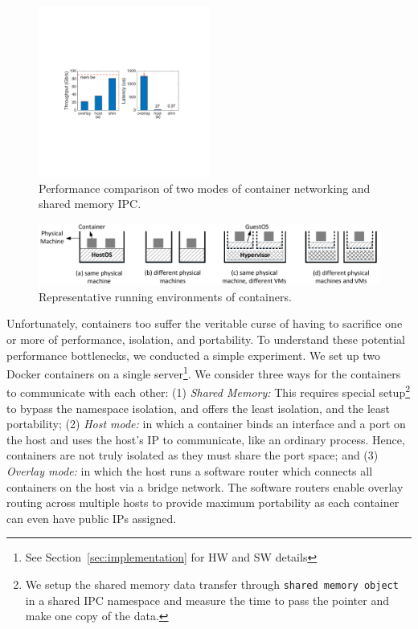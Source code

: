 \begin{figure}[th]
     \centering 
     \includegraphics[width=0.5\textwidth]{figures/intro/intro_exist2.pdf} 
     \caption{Performance comparison of two modes of container networking and shared memory IPC.} 
     \label{fig:three_modes} 
\end{figure} 
\begin{figure} [t]
	\centering   
	\includegraphics[width=6.7in]{figures/deployment-cases.pdf}   
	\caption{\label{fig:deploy-cases} Representative running environments of containers.}   
\end{figure}

Unfortunately, containers too suffer the veritable curse of having to sacrifice
one or more of performance, isolation, and portability. To understand these
potential performance bottlenecks, we conducted a simple experiment.  We set up
two Docker containers on a single server\footnote{See Section~\ref{sec:implementation} for HW and SW details}. We consider three
ways for the containers to communicate with each other: (1) {\em Shared Memory:}
This requires special setup\footnote{We setup the shared memory data transfer
through \texttt{shared memory object} in a shared IPC namespace and measure the
time to pass the pointer and make one copy of the data.} to bypass the
namespace isolation, and offers the least isolation, and the least portability;
(2) {\em Host mode:} in which a container binds an interface and a port on the
host and uses the host's IP to communicate, like an ordinary process. Hence,
containers are not truly isolated as they must share the port space; and (3)
{\em Overlay mode:} in which the host runs a software router which connects all
containers on the host via a bridge network.  The software routers enable
overlay routing across multiple hosts to provide maximum portability as each
container can even have public IPs assigned.

